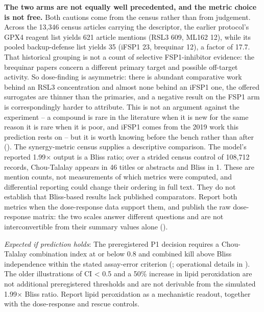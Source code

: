 \documentclass[11pt,twoside,openright]{report}
\begin{document}
\textbf{The two arms are not equally well precedented, and the metric choice is not free.} Both cautions come from the census rather than from judgement. Across the 13,346 census articles carrying the  descriptor, the earlier protocol's GPX4 reagent list yields 621 article mentions (RSL3 609, ML162 12), while its pooled backup-defense list yields 35 (iFSP1 23, brequinar 12), a factor of 17.7. That historical grouping is not a count of selective FSP1-inhibitor evidence: the brequinar papers concern a different primary target and possible off-target activity. So dose-finding is asymmetric: there is abundant comparative work behind an RSL3 concentration and almost none behind an iFSP1 one, the offered surrogates are thinner than the primaries, and a negative result on the FSP1 arm is correspondingly harder to attribute. This is not an argument against the experiment -- a compound is rare in the literature when it is new for the same reason it is rare when it is poor, and iFSP1 comes from the 2019 work this prediction rests on -- but it is worth knowing before the bench rather than after (). The synergy-metric census supplies a descriptive comparison. The model's reported 1.99$\times$ output is a Bliss ratio; over a strided census control of 108,712 records, Chou-Talalay appears in 46 titles or abstracts and Bliss in 1. These are mention counts, not measurements of which metrics were computed, and differential reporting could change their ordering in full text. They do not establish that Bliss-based results lack published comparators. Report both metrics when the dose-response data support them, and publish the raw dose-response matrix: the two scales answer different questions and are not interconvertible from their summary values alone ().

\textit{Expected if prediction holds}: The preregistered P1 decision requires a Chou-Talalay combination index at or below 0.8 and combined kill above Bliss independence within the stated assay-error criterion (; operational details in ). The older illustrations of CI < 0.5 and a 50\% increase in lipid peroxidation are not additional preregistered thresholds and are not derivable from the simulated 1.99$\times$ Bliss ratio. Report lipid peroxidation as a mechanistic readout, together with the dose-response and rescue controls.
\end{document}
